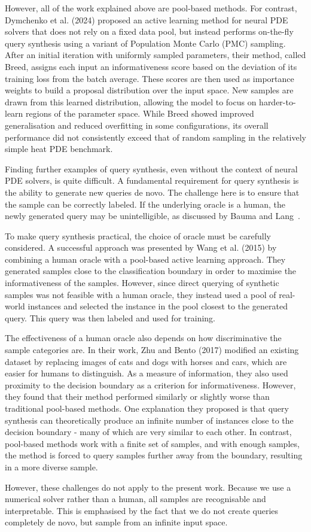 However, all of the work explained above are pool-based methods. For contrast, Dymchenko et al. (2024) proposed an active learning method for neural PDE solvers that does not rely on a fixed data pool, but instead performs on-the-fly query synthesis using a variant of Population Monte Carlo (PMC) sampling. After an initial iteration with uniformly sampled parameters, their method, called Breed, assigns each input an informativeness score based on the deviation of its training loss from the batch average. These scores are then used as importance weights to build a proposal distribution over the input space. New samples are drawn from this learned distribution, allowing the model to focus on harder-to-learn regions of the parameter space. While Breed showed improved generalisation and reduced overfitting in some configurations, its overall performance did not consistently exceed that of random sampling in the relatively simple heat PDE benchmark.

Finding further examples of query synthesis, even without the context of neural PDE solvers, is quite difficult. A fundamental requirement for query synthesis is the ability to generate new queries de novo. The challenge here is to ensure that the sample can be correctly labeled. If the underlying oracle is a human, the newly generated query may be unintelligible, as discussed by Bauma and Lang~\cite{baum1992query}.

To make query synthesis practical, the choice of oracle must be carefully considered. A successful approach was presented by Wang et al. (2015) by combining a human oracle with a pool-based active learning approach. They generated samples close to the classification boundary in order to maximise the informativeness of the samples. However, since direct querying of synthetic samples was not feasible with a human oracle, they instead used a pool of real-world instances and selected the instance in the pool closest to the generated query. This query was then labeled and used for training. 

The effectiveness of a human oracle also depends on how discriminative the sample categories are. In their work, Zhu and Bento (2017) modified an existing dataset by replacing images of cats and dogs with horses and cars, which are easier for humans to distinguish. As a measure of information, they also used proximity to the decision boundary as a criterion for informativeness. However, they found that their method performed similarly or slightly worse than traditional pool-based methods. One explanation they proposed is that query synthesis can theoretically produce an infinite number of instances close to the decision boundary - many of which are very similar to each other. In contrast, pool-based methods work with a finite set of samples, and with enough samples, the method is forced to query samples further away from the boundary, resulting in a more diverse sample.

However, these challenges do not apply to the present work. Because we use a numerical solver rather than a human, all samples are recognisable and interpretable. This is emphasised by the fact that we do not create queries completely de novo, but sample from an infinite input space.
